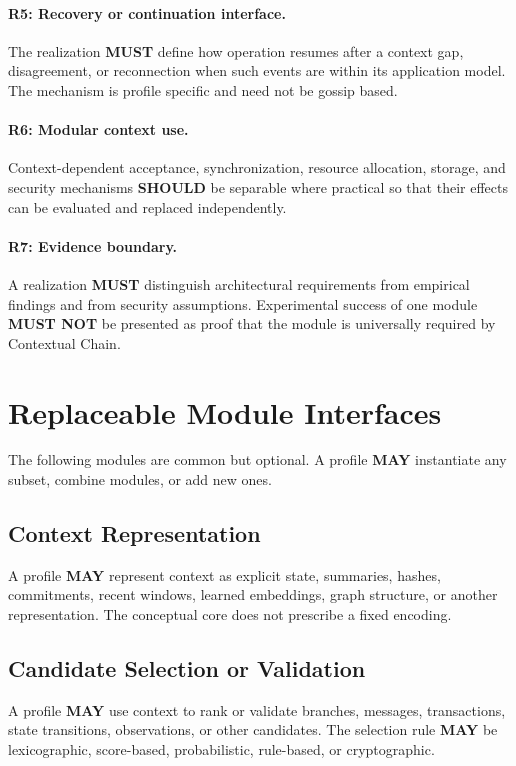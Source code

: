 \documentclass[11pt]{article}
\begin{document}
\paragraph{R5: Recovery or continuation interface.}
The realization \textbf{MUST} define how operation resumes after a context gap, disagreement, or
reconnection when such events are within its application model. The mechanism is profile specific
and need not be gossip based.

\paragraph{R6: Modular context use.}
Context-dependent acceptance, synchronization, resource allocation, storage, and security
mechanisms \textbf{SHOULD} be separable where practical so that their effects can be evaluated
and replaced independently.

\paragraph{R7: Evidence boundary.}
A realization \textbf{MUST} distinguish architectural requirements from empirical findings and
from security assumptions. Experimental success of one module \textbf{MUST NOT} be presented
as proof that the module is universally required by Contextual Chain.

\section{Replaceable Module Interfaces}
The following modules are common but optional. A profile \textbf{MAY} instantiate any subset,
combine modules, or add new ones.

\subsection{Context Representation}
A profile \textbf{MAY} represent context as explicit state, summaries, hashes, commitments, recent
windows, learned embeddings, graph structure, or another representation. The conceptual core
does not prescribe a fixed encoding.

\subsection{Candidate Selection or Validation}
A profile \textbf{MAY} use context to rank or validate branches, messages, transactions, state
transitions, observations, or other candidates. The selection rule \textbf{MAY} be lexicographic,
score-based, probabilistic, rule-based, or cryptographic.
\end{document}
